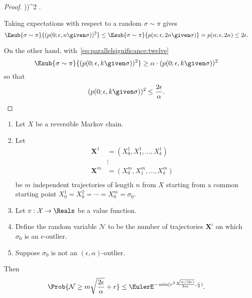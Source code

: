 \documentclass[12pt]{article}
\begin{document}
\begin{proof}
    \given \sigma))^2 \epsilon \).
\item
    Taking expectations with respect to a random \( \sigma \sim \pi \)
    gives
    \[
        \Esub{\sigma \sim \pi}{(p(0; \epsilon, n \given \sigma))^2 } \le
        \Esub{\sigma \sim \pi}{p(n; \epsilon, 2n \given \sigma) } = p(n;
        \epsilon, 2n) \le 2\epsilon.
    \]
\item
    On the other hand, with~\eqref{eq:parallelsignificance:twelve}
    \[
        \Esub{\sigma \sim \pi}{(p(0; \epsilon, k \given \sigma))^2 } \ge
        \alpha \cdot (p(0; \epsilon, k \given \sigma))^2
    \] so that
    \[
        (p(0; \epsilon, k \given \sigma))^2 \le \frac{2\epsilon} {\alpha}.
    \]
\end{proof}

\begin{theorem}
    \label{thm:parallelsignificance:thm3point1}
    \begin{enumerate}
        \item
            Let \( X \) be a reversible Markov chain.
        \item
            Let
            \begin{align*}
                \mathbf{X}^1 &= (X_0^1, X_1^1, \dots, X_k^1 )\\
                &\vdots \\
                \mathbf{X}^m &= (X_0^m, X_1^m, \dots, X_k^m )\\
            \end{align*}
            be \( m \) independent trajectories of length \( n \) from \(
            X \) starting from a common starting point \( X_0^1 = X_0^2
            = \cdots = X_0^m = \sigma_0 \).
        \item
            Let \( v :  \mathcal{X} \to \Reals \) be a value function.
        \item
            Define the random variable \( \mathcal{N} \) to be the
            number of trajectories \( \mathbf{X}^i \) on which \( \sigma_0
            \) is an \( \epsilon \)-outlier.
        \item
            Suppose \( \sigma_0 \) is not an \( (\epsilon, \alpha) \)-outlier.
    \end{enumerate}
    Then
    \[
        \Prob{\mathcal{N} \ge m \sqrt{\frac{2\epsilon}{\alpha}} + r} \le
        \EulerE^{-\min(r^2 \frac{\sqrt{\alpha/(2\epsilon)}}{3m}, \frac{r}
        {3})}.
    \]
\end{theorem}
\end{document}
